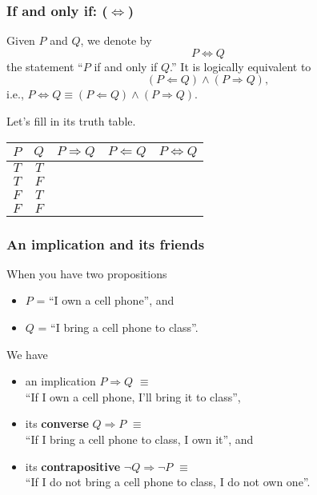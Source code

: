 \begin{frame}\frametitle{If and only if: ($\Leftrightarrow$)}
  Given $P$ and $Q$, we denote by
  \[ P\Leftrightarrow Q \]
  the statement ``$P$ if and only if $Q$.''
  \pause
  It is logically equivalent to
  \[ (P\Leftarrow Q)\wedge (P\Rightarrow Q), \]
  i.e., $P\Leftrightarrow Q \equiv (P\Leftarrow Q)\wedge (P\Rightarrow Q)$.

  Let's fill in its truth table.
  \begin{tcolorbox}
    \begin{tabular}{|c|c||c|c|c|}
      \hline
      $P$ & $Q$ & $P\Rightarrow Q$ & $P\Leftarrow Q$ & $P\Leftrightarrow Q$ \\
      \hline
      $T$ & $T$ & & & \\
      $T$ & $F$ & & & \\
      $F$ & $T$ & & & \\
      $F$ & $F$ & & & \\
      \hline
    \end{tabular}
  \end{tcolorbox}
\end{frame}

\begin{frame}\frametitle{An implication and its friends}
  When you have two propositions
  \begin{itemize}
  \item $P$ = ``I own a cell phone'', and
  \item $Q$ = ``I bring a cell phone to class''.
  \end{itemize}
  We have
  \begin{itemize}
  \item an implication $P\Rightarrow Q$ $\equiv$ \\ ``If I own a cell phone,
    I'll bring it to class'',
  \item its {\bf converse} $Q\Rightarrow P$ $\equiv$ \\ ``If I bring a cell phone
    to class, I own it'', and
  \item its {\bf contrapositive} $\neg Q\Rightarrow\neg P$ $\equiv$ \\ ``If I do not
    bring a cell phone to class, I do not own one''.
  \end{itemize}
\end{frame}

